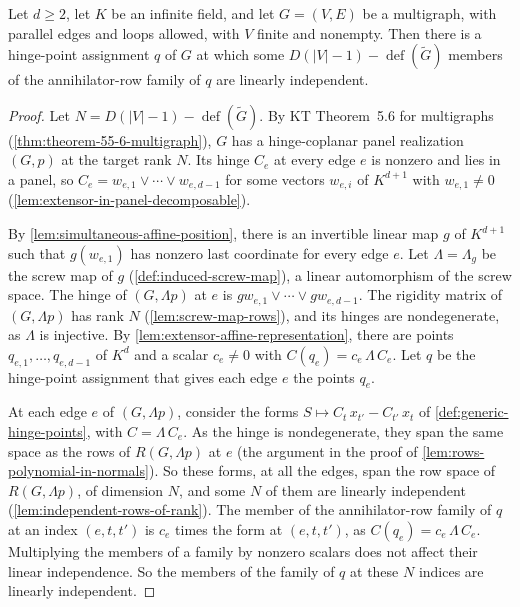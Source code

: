 \begin{lemma}
  \label{lem:hinge-point-witness}
  \leanok
  Let $d \ge 2$, let $K$ be an infinite field, and let $G = (V, E)$ be
  a multigraph, with parallel edges and loops allowed, with $V$ finite
  and nonempty. Then there is a
  hinge-point assignment $q$ of $G$ at which some
  $D(|V|-1) - \operatorname{def}(\tilde G)$ members of the
  annihilator-row family of $q$ are linearly independent.
\end{lemma}
\begin{proof}
  \leanok
  Let $N = D(|V|-1) - \operatorname{def}(\tilde G)$. By KT
  Theorem~5.6 for multigraphs (\cref{thm:theorem-55-6-multigraph}),
  $G$ has a hinge-coplanar panel realization $(G, p)$ at the target
  rank $N$. Its hinge $C_e$ at every edge $e$ is nonzero and lies in a
  panel, so $C_e = w_{e,1} \vee \cdots \vee w_{e,d-1}$ for some
  vectors $w_{e,i}$ of $K^{d+1}$ with $w_{e,1} \neq 0$
  (\cref{lem:extensor-in-panel-decomposable}).

  By \cref{lem:simultaneous-affine-position}, there is an invertible
  linear map $g$ of $K^{d+1}$ such that $g(w_{e,1})$ has nonzero last
  coordinate for every edge $e$. Let $\Lambda = \Lambda_g$ be the screw
  map of $g$ (\cref{def:induced-screw-map}), a linear automorphism of
  the screw space. The hinge of $(G, \Lambda p)$ at $e$ is
  $g w_{e,1} \vee \cdots \vee g w_{e,d-1}$. The rigidity matrix of
  $(G, \Lambda p)$ has rank $N$ (\cref{lem:screw-map-rows}), and its
  hinges are nondegenerate, as $\Lambda$ is injective. By
  \cref{lem:extensor-affine-representation}, there are points
  $q_{e,1}, \dots, q_{e,d-1}$ of $K^d$ and a scalar $c_e \neq 0$ with
  $C(q_e) = c_e\, \Lambda\, C_e$. Let $q$ be the hinge-point
  assignment that gives each edge $e$ the points $q_e$.

  At each edge $e$ of $(G, \Lambda p)$, consider the forms
  $S \mapsto C_t\, x_{t'} - C_{t'}\, x_t$ of
  \cref{def:generic-hinge-points}, with $C = \Lambda\, C_e$.
  As the hinge is nondegenerate, they span the same space as the rows
  of $R(G, \Lambda p)$ at $e$ (the argument in the proof of
  \cref{lem:rows-polynomial-in-normals}). So these forms, at all the
  edges, span the row space of $R(G, \Lambda p)$, of dimension $N$, and
  some $N$ of them are linearly independent
  (\cref{lem:independent-rows-of-rank}). The member of the
  annihilator-row family of $q$ at an index $(e, t, t')$ is $c_e$ times the form at $(e, t, t')$, as
  $C(q_e) = c_e\, \Lambda\, C_e$. Multiplying the members of a
  family by nonzero scalars does not affect their linear independence.
  So the members of the family of $q$ at these $N$ indices are linearly
  independent.
\end{proof}

